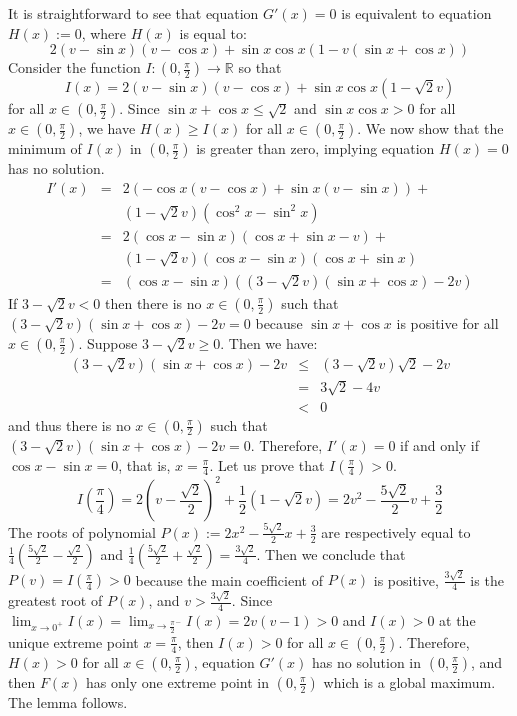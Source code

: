 \documentclass[11pt,a4paper,oneside,onecolumn]{article}
\def\QED{\ensuremath{{\square}}}
\def\markatright#1{\leavevmode\unskip\nobreak\quad\hspace*{\fill}{#1}}
\newenvironment{proof}
{\begin{trivlist}\item[\hskip\labelsep{\bf Proof.}]}
{\markatright{\QED}\end{trivlist}}
\begin{document}
\begin{proof}
It is straightforward to see that equation $G'(x)=0$ is equivalent
to equation $H(x):=0$, where $H(x)$ is equal to:
$$2(v-\sin x)(v-\cos x)+\sin x\cos x(1-v(\sin x+\cos x))$$
Consider the function $I:(0,\frac{\pi}{2})\rightarrow\mathbb{R}$ so
that
$$I(x)=2(v-\sin x)(v-\cos x)+\sin x\cos x(1-\sqrt{2}v)$$
for all $x\in(0,\frac{\pi}{2})$. Since $\sin x+\cos x\leq\sqrt{2}$
and $\sin x\cos x>0$ for all $x\in(0,\frac{\pi}{2})$, we have
$H(x)\geq I(x)$ for all $x\in(0,\frac{\pi}{2})$. We now show that
the minimum of $I(x)$ in $(0,\frac{\pi}{2})$ is greater than zero,
implying equation $H(x)=0$ has no solution.
\begin{eqnarray*}
I'(x)&=&2(-\cos x(v-\cos x)+\sin x(v-\sin x))+\\
& &(1-\sqrt{2}v)(\cos^2x-\sin^2x)\\
&=&2(\cos x-\sin x)(\cos x+\sin x-v)+\\
& &(1-\sqrt{2}v)(\cos x-\sin x)(\cos x+\sin x)\\
&=&(\cos x-\sin x)\left((3-\sqrt{2}v)(\sin x+\cos x)-2v\right)
\end{eqnarray*}
If $3-\sqrt{2}v<0$ then there is no $x\in(0,\frac{\pi}{2})$ such
that $(3-\sqrt{2}v)(\sin x+\cos x)-2v=0$ because $\sin x+\cos x$ is
positive for all $x\in(0,\frac{\pi}{2})$. Suppose
$3-\sqrt{2}v\geq0$. Then we have:
\begin{eqnarray*}
 (3-\sqrt{2}v)(\sin x+\cos x)-2v & \leq & (3-\sqrt{2}v)\sqrt{2}-2v\\
 & = & 3\sqrt{2}-4v\\
 & < & 0
\end{eqnarray*}
and thus there is no $x\in(0,\frac{\pi}{2})$ such that
$(3-\sqrt{2}v)(\sin x+\cos x)-2v=0$. Therefore, $I'(x)=0$ if and
only if $\cos x-\sin x=0$, that is, $x=\frac{\pi}{4}$. Let us prove
that $I(\frac{\pi}{4})>0$.
$$I\left(\frac{\pi}{4}\right)=2\left(v-\frac{\sqrt{2}}{2}\right)^2+\frac{1}{2}
\left(1-\sqrt{2}v\right)=2v^2-\frac{5\sqrt{2}}{2}v+\frac{3}{2}$$ The
roots of polynomial $P(x):=2x^2-\frac{5\sqrt{2}}{2}x+\frac{3}{2}$
are respectively equal to
$\frac{1}{4}\left(\frac{5\sqrt{2}}{2}-\frac{\sqrt{2}}{2}\right)$ and
$\frac{1}{4}\left(\frac{5\sqrt{2}}{2}+\frac{\sqrt{2}}{2}\right)=\frac{3\sqrt{2}}{4}$. 
Then we conclude that
$P(v)=I\left(\frac{\pi}{4}\right)>0$ because the main coefficient of
$P(x)$ is positive, $\frac{3\sqrt{2}}{4}$ is the greatest root of
$P(x)$, and $v>\frac{3\sqrt{2}}{4}$. Since $\lim_{x\rightarrow
0^{+}}I(x)=\lim_{x\rightarrow \frac{\pi}{2}^{-}}I(x)=2v(v-1)>0$ and
$I(x)>0$ at the unique extreme point $x=\frac{\pi}{4}$, then
$I(x)>0$ for all $x\in(0,\frac{\pi}{2})$. Therefore, $H(x)>0$ for
all $x\in(0,\frac{\pi}{2})$, equation $G'(x)$ has no solution in
$(0,\frac{\pi}{2})$, and then $F(x)$ has only one extreme point in
$(0,\frac{\pi}{2})$ which is a global maximum. The lemma
follows.
\end{proof}
\end{document}
